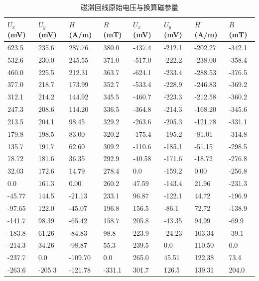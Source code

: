 \documentclass[]{../template/Report}%
\begin{document}
\begin{fullreportonly}
\begin{table}[H]
    \centering
    \caption{磁滞回线原始电压与换算磁参量}
    \scriptsize
    \setlength{\tabcolsep}{2.8pt}
    \begin{tabularx}{\textwidth}{XXXX|XXXX}
        \toprule
        $U_x$ (mV) & $U_y$ (mV) & $H$ (A/m) & $B$ (mT) & $U_x$ (mV) & $U_y$ (mV) & $H$ (A/m) & $B$ (mT) \\
        \midrule
        623.5 & 235.6 & 287.76 & 380.0 & -437.4 & -212.1 & -202.27 & -342.1 \\
        532.6 & 230.0 & 245.55 & 371.0 & -517.0 & -222.2 & -238.00 & -358.4 \\
        460.0 & 225.5 & 212.31 & 363.7 & -624.1 & -233.4 & -288.53 & -376.5 \\
        377.0 & 218.7 & 173.99 & 352.7 & -533.4 & -228.9 & -246.83 & -369.2 \\
        312.1 & 214.2 & 144.92 & 345.5 & -460.7 & -223.3 & -212.58 & -360.2 \\
        247.3 & 208.6 & 114.20 & 336.5 & -364.8 & -214.3 & -168.20 & -345.6 \\
        213.5 & 204.1 & 98.45 & 329.2 & -263.6 & -205.3 & -121.78 & -331.1 \\
        179.8 & 198.5 & 83.00 & 320.2 & -175.4 & -195.2 & -81.01 & -314.8 \\
        135.7 & 191.7 & 62.60 & 309.2 & -110.6 & -185.1 & -51.15 & -298.5 \\
        78.72 & 181.6 & 36.35 & 292.9 & -40.58 & -171.6 & -18.72 & -276.8 \\
        32.03 & 172.6 & 14.79 & 278.4 & 0.0 & -159.2 & 0.00 & -256.8 \\
        0.0 & 161.3 & 0.00 & 260.2 & 47.59 & -143.4 & 21.96 & -231.3 \\
        -45.77 & 144.5 & -21.13 & 233.1 & 96.87 & -122.1 & 44.72 & -196.9 \\
        -97.65 & 122.0 & -45.07 & 196.8 & 156.5 & -86.1 & 72.72 & -138.9 \\
        -141.7 & 98.39 & -65.42 & 158.7 & 205.8 & -43.35 & 94.99 & -69.9 \\
        -183.8 & 61.26 & -84.83 & 98.8 & 223.9 & -24.23 & 103.34 & -39.1 \\
        -214.3 & 34.26 & -98.87 & 55.3 & 239.5 & 0.0 & 110.50 & 0.0 \\
        -237.7 & 0.0 & -109.70 & 0.0 & 265.0 & 45.51 & 122.38 & 73.4 \\
        -263.6 & -205.3 & -121.78 & -331.1 & 301.7 & 126.5 & 139.31 & 204.0 \\

\end{tabularx}
\end{table}
\end{fullreportonly}
\end{document}
